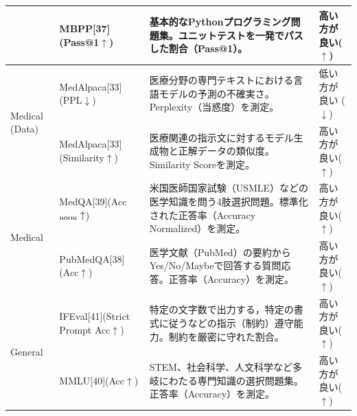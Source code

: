 \documentclass{article}
\begin{document}
\begin{table}[htbp]
\begin{tabularx}{\textwidth}{p{2.0cm}p{3.3cm}Xp{2.2cm}}
& MBPP[37](Pass@1$\uparrow$) & 基本的なPythonプログラミング問題集。ユニットテストを一発でパスした割合（Pass@1）。 & 高い方が良い($\uparrow$) \\
\midrule
\multirow{2}{*}{Medical (Data)}
& MedAlpaca[33](PPL$\downarrow$) & 医療分野の専門テキストにおける言語モデルの予測の不確実さ。Perplexity（当惑度）を測定。 & 低い方が良い ($\downarrow$) \\
& MedAlpaca[33](Similarity$\uparrow$) & 医療関連の指示文に対するモデル生成物と正解データの類似度。Similarity Scoreを測定。 & 高い方が良い($\uparrow$) \\
\midrule
\multirow{2}{*}{Medical}
& MedQA[39](Acc$_{\rm norm}\uparrow$) & 米国医師国家試験（USMLE）などの医学知識を問う4肢選択問題。標準化された正答率（Accuracy Normalized）を測定。 & 高い方が良い($\uparrow$) \\
& PubMedQA[38](Acc$\uparrow$) & 医学文献（PubMed）の要約からYes/No/Maybeで回答する質問応答。正答率（Accuracy）を測定。 & 高い方が良い($\uparrow$) \\
\midrule
\multirow{2}{*}{General}
& IFEval[41](Strict Prompt Acc$\uparrow$) & 特定の文字数で出力する，特定の書式に従うなどの指示（制約）遵守能力。制約を厳密に守れた割合。 & 高い方が良い($\uparrow$) \\
& MMLU[40](Acc$\uparrow$) & STEM、社会科学、人文科学など多岐にわたる専門知識の選択問題集。正答率（Accuracy）を測定。 & 高い方が良い($\uparrow$) \\
\bottomrule
\end{tabularx}
\end{table}

\end{document}
